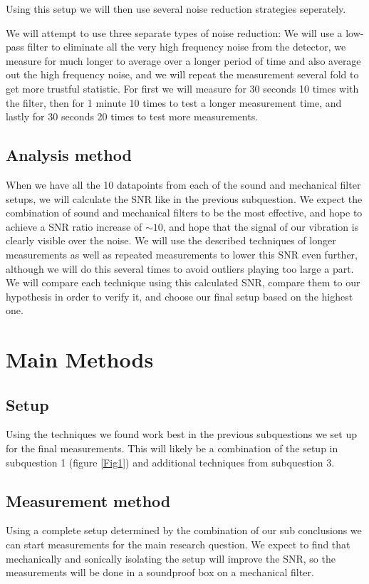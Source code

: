 \documentclass[a4paper,11pt]{article} %
\begin{document}
Using this setup we will then use several noise reduction strategies seperately.

We will attempt to use three separate types of noise reduction: We will use a low-pass filter to eliminate all the very high frequency noise from the detector, we measure for much longer to average over a longer period of time and also average out the high frequency noise, and we will repeat the measurement several fold to get more trustful statistic. For first we will measure for 30 seconds 10 times with the filter, then for 1 minute 10 times to test a longer measurement time, and lastly for 30 seconds 20 times to test more measurements.

\subsection{Analysis method}
When we have all the 10 datapoints from each of the sound and mechanical filter setups, we will calculate the SNR like in the previous subquestion. We expect the combination of sound and mechanical filters to be the most effective, and hope to achieve a SNR ratio increase of $\sim 10$, and hope that the signal of our vibration is clearly visible over the noise. We will use the described techniques of longer measurements as well as repeated measurements to lower this SNR even further, although we will do this several times to avoid outliers playing too large a part. We will compare each technique using this calculated SNR, compare them to our hypothesis in order to verify it, and choose our final setup based on the highest one.


\section{Main Methods}

\subsection{Setup}
Using the techniques we found work best in the previous subquestions we set up for the final measurements. This will likely be a combination of the setup in subquestion 1 (figure \ref{Fig1}) and additional techniques from subquestion 3.

\subsection{Measurement method}
Using a complete setup determined by the combination of our sub conclusions we can start measurements for the main research question. We expect to find that mechanically and sonically isolating the setup will improve the SNR, so the measurements will be done in a soundproof box on a mechanical filter. 
\end{document}
